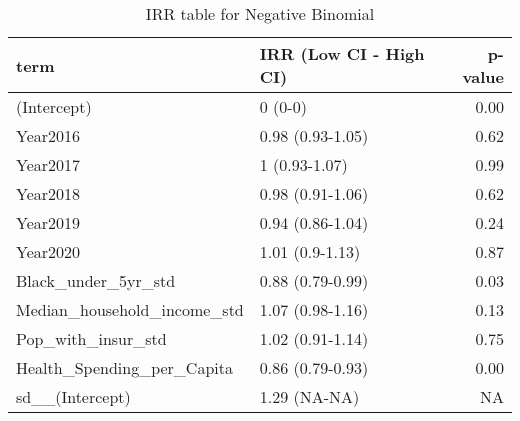 \documentclass[
]{article}
\newenvironment{Shaded}{\begin{snugshade}}{\end{snugshade}}
\newcommand{\AttributeTok}[1]{\textcolor[rgb]{0.13,0.29,0.53}{#1}}
\newcommand{\CommentTok}[1]{\textcolor[rgb]{0.56,0.35,0.01}{\textit{#1}}}
\newcommand{\DecValTok}[1]{\textcolor[rgb]{0.00,0.00,0.81}{#1}}
\newcommand{\FunctionTok}[1]{\textcolor[rgb]{0.13,0.29,0.53}{\textbf{#1}}}
\newcommand{\NormalTok}[1]{#1}
\newcommand{\OtherTok}[1]{\textcolor[rgb]{0.56,0.35,0.01}{#1}}
\newcommand{\SpecialCharTok}[1]{\textcolor[rgb]{0.81,0.36,0.00}{\textbf{#1}}}
\newcommand{\StringTok}[1]{\textcolor[rgb]{0.31,0.60,0.02}{#1}}
\begin{document}
\begin{Shaded}
\end{Shaded}

\begin{table}

\caption{\label{tab:unnamed-chunk-17}IRR table for Negative Binomial}
\centering
\begin{tabular}[t]{l|l|r}
\hline
term & IRR (Low CI - High CI) & p-value\\
\hline
(Intercept) & 0 (0-0) & 0.00\\
\hline
Year2016 & 0.98 (0.93-1.05) & 0.62\\
\hline
Year2017 & 1 (0.93-1.07) & 0.99\\
\hline
Year2018 & 0.98 (0.91-1.06) & 0.62\\
\hline
Year2019 & 0.94 (0.86-1.04) & 0.24\\
\hline
Year2020 & 1.01 (0.9-1.13) & 0.87\\
\hline
Black\_under\_5yr\_std & 0.88 (0.79-0.99) & 0.03\\
\hline
Median\_household\_income\_std & 1.07 (0.98-1.16) & 0.13\\
\hline
Pop\_with\_insur\_std & 1.02 (0.91-1.14) & 0.75\\
\hline
Health\_Spending\_per\_Capita & 0.86 (0.79-0.93) & 0.00\\
\hline
sd\_\_(Intercept) & 1.29 (NA-NA) & NA\\
\hline
\end{tabular}
\end{table}
\end{document}
